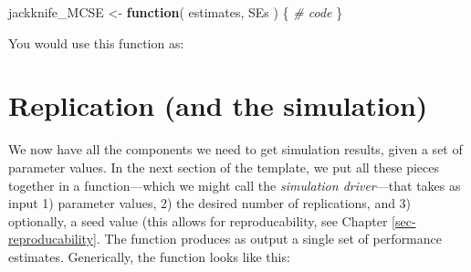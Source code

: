 \documentclass[
]{book}
\newenvironment{Shaded}{\begin{snugshade}}{\end{snugshade}}
\newcommand{\CommentTok}[1]{\textcolor[rgb]{0.56,0.35,0.01}{\textit{#1}}}
\newcommand{\ControlFlowTok}[1]{\textcolor[rgb]{0.13,0.29,0.53}{\textbf{#1}}}
\newcommand{\FunctionTok}[1]{\textcolor[rgb]{0.13,0.29,0.53}{\textbf{#1}}}
\newcommand{\NormalTok}[1]{#1}
\newcommand{\OtherTok}[1]{\textcolor[rgb]{0.56,0.35,0.01}{#1}}
\newcommand{\SpecialCharTok}[1]{\textcolor[rgb]{0.81,0.36,0.00}{\textbf{#1}}}
\begin{document}
\begin{Shaded}
\begin{Highlighting}[]
\NormalTok{jackknife\_MCSE }\OtherTok{\textless{}{-}} \ControlFlowTok{function}\NormalTok{( estimates, SEs ) \{}
  \CommentTok{\# code}
\NormalTok{\}}
\end{Highlighting}
\end{Shaded}

You would use this function as:

\begin{Shaded}
\end{Shaded}

\section{Replication (and the simulation)}\label{replication-and-the-simulation}

We now have all the components we need to get simulation results, given a set of parameter values.
In the next section of the template, we put all these pieces together in a function---which we might call the \emph{simulation driver}---that takes as input 1) parameter values, 2) the desired number of replications, and 3) optionally, a seed value (this allows for reproducability, see Chapter \ref{sec-reproducability}. The function produces as output a single set of performance estimates. Generically, the function looks like this:
\end{document}
